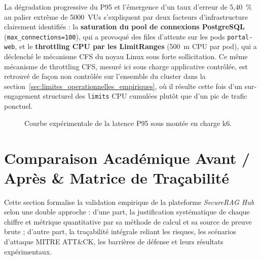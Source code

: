 La dégradation progressive du P95 et l'émergence d'un taux d'erreur de 5,40~\% au palier extrême de 5000~VUs s'expliquent par deux facteurs d'infrastructure clairement identifiés : la \textbf{saturation du pool de connexions PostgreSQL} (\texttt{max\_connections=100}), qui a provoqué des files d'attente sur les pods \texttt{portal-web}, et le \textbf{throttling CPU par les LimitRanges} (500~m CPU par pod), qui a déclenché le mécanisme CFS du noyau Linux sous forte sollicitation. Ce même mécanisme de throttling CFS, mesuré ici sous charge applicative contrôlée, est retrouvé de façon non contrôlée sur l'ensemble du cluster dans la section~\ref{sec:limites_operationnelles_empiriques}, où il résulte cette fois d'un sur-engagement structurel des \texttt{limits} CPU cumulées plutôt que d'un pic de trafic ponctuel.

\begin{figure}[H]
\centering
\scriptsize
{}
\caption{Courbe expérimentale de la latence P95 sous montée en charge k6.}
\label{fig:k6_chart_full_section}
\end{figure}


\section{Comparaison Académique Avant / Après \& Matrice de Traçabilité}
\label{sec:comparaison_avant_apres}

Cette section formalise la validation empirique de la plateforme \textit{SecureRAG Hub} selon une double approche : d'une part, la justification systématique de chaque chiffre et métrique quantitative par sa méthode de calcul et sa source de preuve brute ; d'autre part, la traçabilité intégrale reliant les risques, les scénarios d'attaque MITRE ATT\&CK, les barrières de défense et leurs résultats expérimentaux.

